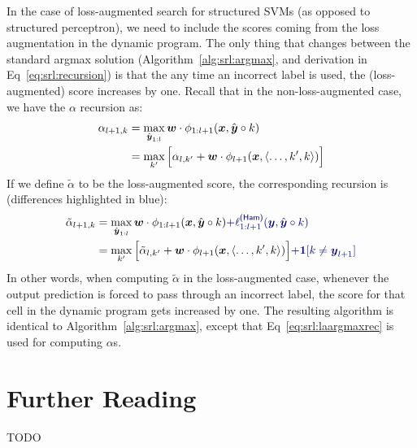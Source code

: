 In the case of loss-augmented search for structured SVMs (as opposed to structured perceptron), we need to include the scores coming from the loss augmentation in the dynamic program.
The only thing that changes between the standard argmax solution (Algorithm~\ref{alg:srl:argmax}, and derivation in Eq~\eqref{eq:srl:recursion}) is that the any time an incorrect label is used, the (loss-augmented) score increases by one.
Recall that in the non-loss-augmented case, we have the $\alpha$ recursion as:
\begin{align}
\alpha_{l+1,k} &= \max_{\hat{{\boldsymbol{y}}}_{1:l}} {\boldsymbol{w}} \cdot \phi_{1:l+1}({\boldsymbol{x}}, \hat{{\boldsymbol{y}}} \circ k) \\
   &= \max_{k'} \Big[ \alpha_{l,k'} + {\boldsymbol{w}} \cdot \phi_{l+1}({\boldsymbol{x}}, \langle \dots, k', k \rangle) \Big]
\end{align}
If we define $\tilde\alpha$ to be the loss-augmented score, the corresponding recursion is (differences highlighted in blue):
\begin{align}
\tilde\alpha_{l+1,k}
  &= \max_{\hat\vy_{1:l}} \dotp{\vw}{\phi_{1:l+1}(\vx, \hat\vy \circ k)} \textcolor{darkblue}{+ \ell^{\textsf{(Ham)}}_{1:l+1}(\vy, \hat\vy\circ k)}\\
  &= \max_{k'} \Big[ \tilde\alpha_{l,k'} + \dotp{\vw}{\phi_{l+1}(\vx, \langle \dots, k', k \rangle)} \Big]
    \textcolor{darkblue}{+ \Ind[k \neq \vy_{l+1}]} \label{eq:srl:laargmaxrec}
\end{align}
In other words, when computing $\tilde\alpha$ in the loss-augmented case, whenever the output prediction is forced to pass through an incorrect label, the score for that cell in the dynamic program gets increased by one.
The resulting algorithm is identical to Algorithm~\ref{alg:srl:argmax}, except that Eq~\eqref{eq:srl:laargmaxrec} is used for computing $\alpha$s.

\section{Further Reading}

TODO



\begin{comment}
   - Structured perceptron
   - Viterbi
   - Structured SVM
   - ILP
\end{comment}





